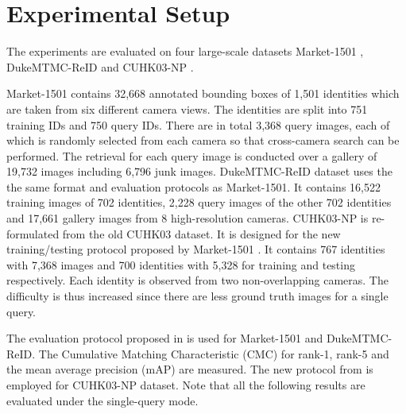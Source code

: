 \documentclass[10pt,twocolumn,letterpaper]{article}
\newcommand{\myparagraph}[1]{\vspace{3pt}\noindent{\bf #1}}
\begin{document}
\section{Experimental Setup} \label{exp}
\myparagraph{Datasets and Protocols.}
The experiments are evaluated on four large-scale datasets Market-1501 \cite{market1501}, DukeMTMC-ReID \cite{duke1} \cite{duke2} and CUHK03-NP \cite{cuhk03}.

Market-1501 contains 32,668 annotated bounding boxes of 1,501 identities which are taken from six different camera views. The identities are split into 751 training IDs and 750 query IDs. There are in total 3,368 query images, each of which is randomly selected from each camera so that cross-camera search can be performed. The retrieval for each query image is conducted over a gallery of 19,732 images including 6,796 junk images. DukeMTMC-ReID dataset uses the the same format and evaluation protocols as Market-1501. It contains 16,522 training images of 702 identities, 2,228 query images of the other 702 identities and 17,661 gallery images from 8 high-resolution cameras.
CUHK03-NP is re-formulated from the old CUHK03 dataset. It is designed for the new training/testing protocol proposed by Market-1501 \cite{market1501}. It contains 767 identities with 7,368 images and 700 identities with 5,328 for training and testing respectively. Each identity is observed from two non-overlapping cameras. The difficulty is thus increased since there are less ground truth images for a single query.

The evaluation protocol proposed in \cite{market1501} is used for Market-1501 and DukeMTMC-ReID. The Cumulative Matching Characteristic (CMC) for rank-1, rank-5 and the mean average  precision (mAP) are measured. The new protocol from \cite{cuhk03} is employed for CUHK03-NP dataset. Note that all the following results are evaluated under the single-query mode.
\end{document}
